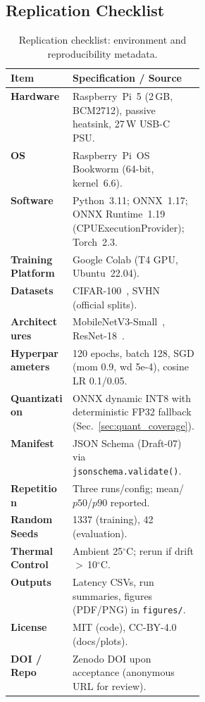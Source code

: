 \documentclass{article}
\begin{document}
\subsection*{Replication Checklist}

\begin{table}[h]
  \centering
  \footnotesize
  \setlength{\tabcolsep}{3pt}
  \renewcommand{\arraystretch}{1.08}
  \caption{Replication checklist: environment and reproducibility metadata.}
  \label{tab:replication}
  \begin{tabularx}{\linewidth}{>{\bfseries}p{0.32\linewidth} X}
    \toprule
    Item & Specification / Source \\
    \midrule
    Hardware & Raspberry~Pi~5 (2\,GB, BCM2712), passive heatsink, 27\,W USB-C PSU. \\
    OS & Raspberry~Pi~OS Bookworm (64-bit, kernel~6.6). \\
    Software & Python~3.11; ONNX~1.17; ONNX Runtime~1.19 (CPUExecutionProvider); Torch~2.3. \\
    Training Platform & Google Colab (T4 GPU, Ubuntu~22.04). \\
    Datasets & CIFAR-100~\cite{krizhevsky2009tiny}, SVHN~\cite{netzer2011svhn} (official splits). \\
    Architectures & MobileNetV3-Small~\cite{howard2019mobilenetv3}, ResNet-18~\cite{he2016resnet}. \\
    Hyperparameters & 120 epochs, batch 128, SGD (mom 0.9, wd 5e-4), cosine LR 0.1/0.05. \\
    Quantization & ONNX dynamic INT8 with deterministic FP32 fallback (Sec.~\ref{sec:quant_coverage}). \\
    Manifest & JSON Schema (Draft-07) via \texttt{jsonschema.validate()}. \\
    Repetition & Three runs/config; mean/$p50$/$p90$ reported. \\
    Random Seeds & 1337 (training), 42 (evaluation). \\
    Thermal Control & Ambient 25$^\circ$C; rerun if drift $>\,$10$^\circ$C. \\
    Outputs & Latency CSVs, run summaries, figures (PDF/PNG) in \texttt{figures/}. \\
    License & MIT (code), CC-BY-4.0 (docs/plots). \\
    DOI / Repo & Zenodo DOI upon acceptance (anonymous URL for review). \\
    \bottomrule
  \end{tabularx}
\end{table}
\end{document}
